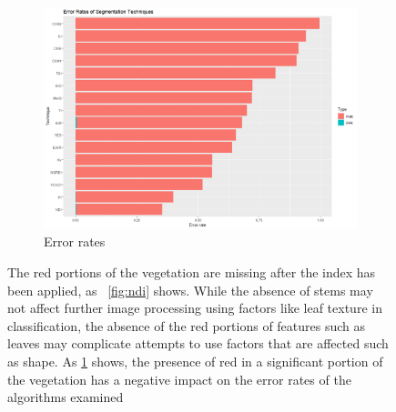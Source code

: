 \documentclass[letterpaper]{article}
\begin{document}
{\begin{figure}[h]
\begin{subfigure}[t]{.30\textwidth}
	 	\centering
	  	\includegraphics[width=1\linewidth]{figures/segmentation-error-rates-color.png}
	  	\caption{Error rates}
	  	\label{fig:error-rates}
	\end{subfigure}
	\caption[Missing red portions of vegetation]{The red portions of the vegetation are missing after the index has been applied, as ~\ref{fig:ndi} shows. While the absence of stems may not affect further image processing using factors like leaf texture in classification, the absence of the red portions of features such as leaves may complicate attempts to use factors that are affected such as shape. As \ref{fig:error-rates} shows, the presence of red in a significant portion of the vegetation has a negative impact on the error rates of the algorithms examined}
	\label{fig:segmentation}
\end{figure}




}
\end{document}
